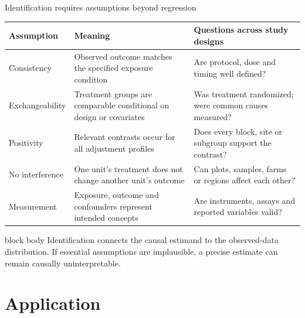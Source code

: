 \documentclass[10pt,aspectratio=169]{beamer}
\begin{document}
\begin{frame}{Identification requires assumptions beyond regression}

\small

\begin{tabularx}{\textwidth}{@{}p{}X X@{}}
\toprule
\textbf{Assumption} & \textbf{Meaning} & \textbf{Questions across study designs} \\
\midrule
Consistency & Observed outcome matches the specified exposure condition & Are protocol, dose and timing well defined? \\
Exchangeability & Treatment groups are comparable conditional on design or covariates & Was treatment randomized; were common causes measured? \\
Positivity & Relevant contrasts occur for all adjustment profiles & Does every block, site or subgroup support the contrast? \\
No interference & One unit's treatment does not change another unit's outcome & Can plots, samples, farms or regions affect each other? \\
Measurement & Exposure, outcome and confounders represent intended concepts & Are instruments, assays and reported variables valid? \\
\bottomrule
\end{tabularx}

\vspace{0.15cm}

\begin{beamercolorbox}[rounded=true,sep=6pt]{block body}
Identification connects the causal estimand to the observed-data distribution. If essential assumptions are implausible, a precise estimate can remain causally uninterpretable.
\end{beamercolorbox}

\end{frame}


\section{Application}
\end{document}
